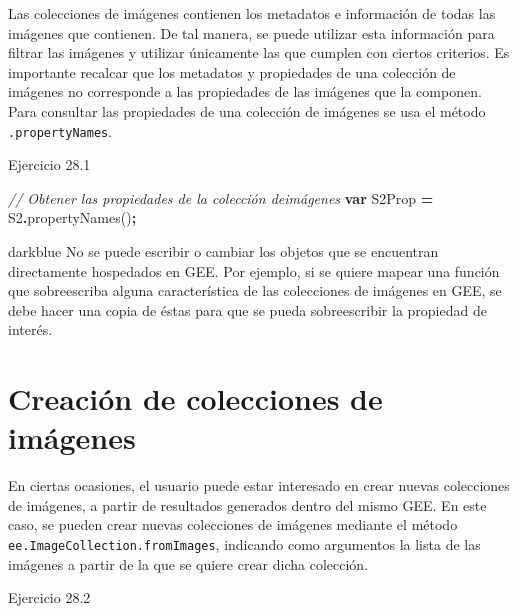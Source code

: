 \documentclass[
  12pt,
  letterpaper,
  twoside]{book}
\newenvironment{Shaded}{\begin{snugshade}}{\end{snugshade}}
\newcommand{\CommentTok}[1]{\textcolor[rgb]{0.56,0.35,0.01}{\textit{#1}}}
\newcommand{\FunctionTok}[1]{\textcolor[rgb]{0.00,0.00,0.00}{#1}}
\newcommand{\KeywordTok}[1]{\textcolor[rgb]{0.13,0.29,0.53}{\textbf{#1}}}
\newcommand{\NormalTok}[1]{#1}
\newcommand{\OperatorTok}[1]{\textcolor[rgb]{0.81,0.36,0.00}{\textbf{#1}}}
\begin{document}
Las colecciones de imágenes contienen los metadatos e información de todas las imágenes que contienen. De tal manera, se puede utilizar esta información para filtrar las imágenes y utilizar únicamente las que cumplen con ciertos criterios. Es importante recalcar que los metadatos y propiedades de una colección de imágenes no corresponde a las propiedades de las imágenes que la componen. Para consultar las propiedades de una colección de imágenes se usa el método \texttt{.propertyNames}.

Ejercicio 28.1

\begin{Shaded}
\begin{Highlighting}[]
\CommentTok{// Obtener las propiedades de la colección deimágenes}
\KeywordTok{var}\NormalTok{ S2Prop }\OperatorTok{=}\NormalTok{ S2}\OperatorTok{.}\FunctionTok{propertyNames}\NormalTok{()}\OperatorTok{;}
\end{Highlighting}
\end{Shaded}

\begin{bluebox2}

\begin{awesomeblock}{5pt}{\faLightbulb}{darkblue}
No se puede escribir o cambiar los objetos que se encuentran directamente hospedados en GEE. Por ejemplo, si se quiere mapear una función que sobreescriba alguna característica de las colecciones de imágenes en GEE, se debe hacer una copia de éstas para que se pueda sobreescribir la propiedad de interés.

\end{awesomeblock}

\end{bluebox2}

\hypertarget{creaciuxf3n-de-colecciones-de-imuxe1genes}{%
\section{Creación de colecciones de imágenes}\label{creaciuxf3n-de-colecciones-de-imuxe1genes}}

En ciertas ocasiones, el usuario puede estar interesado en crear nuevas colecciones de imágenes, a partir de resultados generados dentro del mismo GEE. En este caso, se pueden crear nuevas colecciones de imágenes mediante el método \texttt{ee.ImageCollection.fromImages}, indicando como argumentos la lista de las imágenes a partir de la que se quiere crear dicha colección.

Ejercicio 28.2
\end{document}
